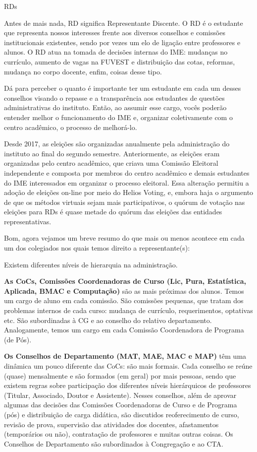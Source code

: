 \begin{subsecao}{RDs}

Antes de mais nada, RD significa Representante Discente. O RD é o estudante 
que representa nossos interesses frente aos diversos conselhos e comissões 
institucionais existentes, sendo por vezes um elo de ligação entre professores 
e alunos. O RD atua na tomada de decisões internas do IME: mudanças no currículo, 
aumento de vagas na FUVEST e distribuição das cotas, reformas, mudança no corpo 
docente, enfim, coisas desse tipo.

Dá para perceber o quanto é importante ter um estudante em cada um desses conselhos 
visando o repasse e a transparência aos estudantes de questões administrativas do 
instituto. Então, ao assumir esse cargo, vocês poderão entender melhor o 
funcionamento do IME e, organizar coletivamente com o centro acadêmico, o processo de 
melhorá-lo.

Desde 2017, as eleições são organizadas anualmente pela administração do instituto 
ao final do segundo semestre. Anteriormente, as eleições eram organizadas pelo centro 
acadêmico, que criava uma Comissão Eleitoral independente e composta por membros do 
centro acadêmico e demais estudantes do IME interessados em organizar o processo eleitoral. 
Essa alteração permitiu a adoção de eleições on-line por meio do Helios Voting, e, embora 
haja o argumento de que os métodos virtuais sejam mais participativos, o quórum de votação 
nas eleições para RDs é quase metade do quórum das eleições das entidades representativas.

Bom, agora vejamos um breve resumo do que mais ou menos acontece em cada um dos 
colegiados nos quais temos direito a representante(s):

Existem diferentes níveis de hierarquia na administração.

{\bf As CoCs,
Comissões Coordenadoras de Curso (Lic, Pura, Estatística, Aplicada, BMAC e
Computação)} são as mais próximas dos alunos. Temos um cargo de aluno em cada
comissão. São comissões pequenas, que tratam dos problemas internos de cada
curso: mudança de currículo, requerimentos, optativas etc. São subordinadas
à CG e ao conselho do relativo departamento. Analogamente, temos um cargo em cada
Comissão Coordenadora de Programa (de Pós).

{\bf Os Conselhos de Departamento (MAT, MAE, MAC e MAP)} têm uma dinâmica um
pouco diferente das CoCs: são mais formais. Cada conselho se reúne (quase)
mensalmente e são formados (em geral) por mais pessoas, sendo que existem
regras sobre participação dos diferentes níveis hierárquicos de
professores (Titular, Associado, Doutor e Assistente). Nesses conselhos, além
de aprovar algumas das decisões das Comissões Coordenadoras de Curso e de
Programa (pós) e distribuição de carga didática, são discutidos reoferecimento
de curso, revisão de prova, supervisão das atividades dos docentes,
afastamentos (temporários ou não), contratação de professores e muitas outras
coisas.
Os Conselhos de Departamento são subordinados à Congregação e ao CTA.


\end{subsecao}
